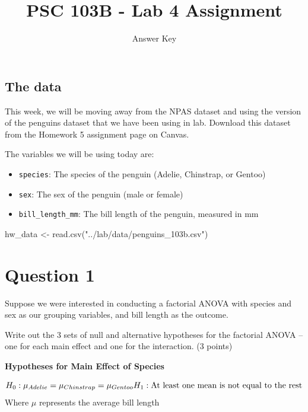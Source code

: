 \documentclass[
  letterpaper,
  DIV=11,
  numbers=noendperiod]{scrartcl}
\title{PSC 103B - Lab 4 Assignment}
\subtitle{Answer Key}
\author{}
\date{}
\newenvironment{Shaded}{\begin{snugshade}}{\end{snugshade}}
\newcommand{\FunctionTok}[1]{\textcolor[rgb]{0.28,0.35,0.67}{#1}}
\newcommand{\NormalTok}[1]{\textcolor[rgb]{0.00,0.23,0.31}{#1}}
\newcommand{\OtherTok}[1]{\textcolor[rgb]{0.00,0.23,0.31}{#1}}
\newcommand{\StringTok}[1]{\textcolor[rgb]{0.13,0.47,0.30}{#1}}
\providecommand{\tightlist}{%
  \setlength{\itemsep}{0pt}\setlength{\parskip}{0pt}}\usepackage{longtable,booktabs,array}
\begin{document}
\maketitle

\subsection{The data}\label{the-data}

This week, we will be moving away from the NPAS dataset and using the
version of the penguins dataset that we have been using in lab. Download
this dataset from the Homework 5 assignment page on Canvas.

The variables we will be using today are:

\begin{itemize}
\tightlist
\item
  \texttt{species}: The species of the penguin (Adelie, Chinstrap, or
  Gentoo)
\item
  \texttt{sex}: The sex of the penguin (male or female)
\item
  \texttt{bill\_length\_mm}: The bill length of the penguin, measured in
  mm
\end{itemize}

\begin{Shaded}
\begin{Highlighting}[]
\NormalTok{hw\_data }\OtherTok{\textless{}{-}} \FunctionTok{read.csv}\NormalTok{(}\StringTok{"../lab/data/penguins\_103b.csv"}\NormalTok{)}
\end{Highlighting}
\end{Shaded}

\section{Question 1}\label{question-1}

Suppose we were interested in conducting a factorial ANOVA with species
and sex as our grouping variables, and bill length as the outcome.

Write out the 3 sets of null and alternative hypotheses for the
factorial ANOVA -- one for each main effect and one for the interaction.
(3 points)

\textbf{Hypotheses for Main Effect of Species}

\[
H_0: \mu_{Adelie} = \mu_{Chinstrap} = \mu_{Gentoo}\\
H_1: \text{At least one mean is not equal to the rest}
\] Where \(\mu\) represents the average bill length
\end{document}
